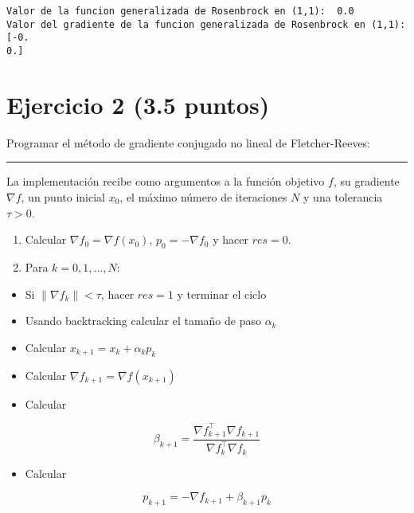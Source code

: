 \documentclass[11pt]{article}
\providecommand{\tightlist}{%
      \setlength{\itemsep}{0pt}\setlength{\parskip}{0pt}}
\begin{document}
    \begin{Verbatim}[commandchars=\\\{\}]
Valor de la funcion generalizada de Rosenbrock en (1,1):  0.0
Valor del gradiente de la funcion generalizada de Rosenbrock en (1,1):  [-0.
0.]
    \end{Verbatim}

    \hypertarget{ejercicio-2-3.5-puntos}{%
\section{Ejercicio 2 (3.5 puntos)}\label{ejercicio-2-3.5-puntos}}

Programar el método de gradiente conjugado no lineal de Fletcher-Reeves:

\begin{center}\rule{0.5\linewidth}{0.5pt}\end{center}

La implementación recibe como argumentos a la función objetivo \(f\), su
gradiente \(\nabla f\), un punto inicial \(x_0\), el máximo número de
iteraciones \(N\) y una tolerancia \(\tau>0\).

\begin{enumerate}
\def\labelenumi{\arabic{enumi}.}
\tightlist
\item
  Calcular \(\nabla f_0 = \nabla f(x_0)\), \(p_0 = -\nabla f_0\) y hacer
  \(res=0\).
\item
  Para \(k=0,1,..., N\):
\end{enumerate}

\begin{itemize}
\tightlist
\item
  Si \(\|\nabla f_k\|< \tau\), hacer \(res=1\) y terminar el ciclo
\item
  Usando backtracking calcular el tamaño de paso \(\alpha_k\)
\item
  Calcular \(x_{k+1} = x_k + \alpha_k p_k\)
\item
  Calcular \(\nabla f_{k+1} = \nabla f(x_{k+1})\)
\item
  Calcular
\end{itemize}

\[ \beta_{k+1} = \frac{\nabla f_{k+1}^\top \nabla f_{k+1}}{\nabla f_{k}^\top\nabla f_{k}}  \]

\begin{itemize}
\tightlist
\item
  Calcular
\end{itemize}

\[ p_{k+1} = -\nabla f_{k+1} + \beta_{k+1} p_k \]
\end{document}

